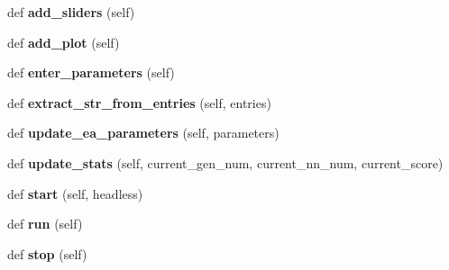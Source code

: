 \begin{DoxyCompactItemize}
\item 
def {\bfseries add\+\_\+sliders} (self)\hypertarget{classMachineGamingWindow_1_1MachineGaming_a4855e87b4596d63add3e6c6eea4c37cd}{}\label{classMachineGamingWindow_1_1MachineGaming_a4855e87b4596d63add3e6c6eea4c37cd}

\item 
def {\bfseries add\+\_\+plot} (self)\hypertarget{classMachineGamingWindow_1_1MachineGaming_aa4bb598e038b65f082e04580b22cc2ba}{}\label{classMachineGamingWindow_1_1MachineGaming_aa4bb598e038b65f082e04580b22cc2ba}

\item 
def {\bfseries enter\+\_\+parameters} (self)\hypertarget{classMachineGamingWindow_1_1MachineGaming_a2afef0dcf7a24256613e5ffcf11dabe5}{}\label{classMachineGamingWindow_1_1MachineGaming_a2afef0dcf7a24256613e5ffcf11dabe5}

\item 
def {\bfseries extract\+\_\+str\+\_\+from\+\_\+entries} (self, entries)\hypertarget{classMachineGamingWindow_1_1MachineGaming_aa9bd6a0d8ddb5378b885f3f03c454321}{}\label{classMachineGamingWindow_1_1MachineGaming_aa9bd6a0d8ddb5378b885f3f03c454321}

\item 
def {\bfseries update\+\_\+ea\+\_\+parameters} (self, parameters)\hypertarget{classMachineGamingWindow_1_1MachineGaming_a5fe0b618eea8c6b463487e4a34812a11}{}\label{classMachineGamingWindow_1_1MachineGaming_a5fe0b618eea8c6b463487e4a34812a11}

\item 
def {\bfseries update\+\_\+stats} (self, current\+\_\+gen\+\_\+num, current\+\_\+nn\+\_\+num, current\+\_\+score)\hypertarget{classMachineGamingWindow_1_1MachineGaming_a04ab71cba412f5717ebaff5c9ca12346}{}\label{classMachineGamingWindow_1_1MachineGaming_a04ab71cba412f5717ebaff5c9ca12346}

\item 
def {\bfseries start} (self, headless)\hypertarget{classMachineGamingWindow_1_1MachineGaming_a3a9714707ad07433db600a5145064fd0}{}\label{classMachineGamingWindow_1_1MachineGaming_a3a9714707ad07433db600a5145064fd0}

\item 
def {\bfseries run} (self)\hypertarget{classMachineGamingWindow_1_1MachineGaming_ac0eca50403df7de38c5d8161fbf04149}{}\label{classMachineGamingWindow_1_1MachineGaming_ac0eca50403df7de38c5d8161fbf04149}

\item 
def {\bfseries stop} (self)\hypertarget{classMachineGamingWindow_1_1MachineGaming_afd9e154143823d295e878d44361fd497}{}\label{classMachineGamingWindow_1_1MachineGaming_afd9e154143823d295e878d44361fd497}


\end{DoxyCompactItemize}
